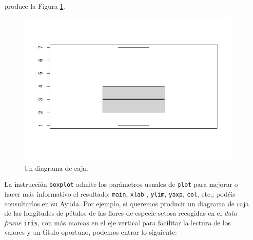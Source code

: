 \documentclass[
]{book}
\newenvironment{Shaded}{\begin{snugshade}}{\end{snugshade}}
\newcommand{\DataTypeTok}[1]{\textcolor[rgb]{0.13,0.29,0.53}{#1}}
\newcommand{\DecValTok}[1]{\textcolor[rgb]{0.00,0.00,0.81}{#1}}
\newcommand{\FloatTok}[1]{\textcolor[rgb]{0.00,0.00,0.81}{#1}}
\newcommand{\KeywordTok}[1]{\textcolor[rgb]{0.13,0.29,0.53}{\textbf{#1}}}
\newcommand{\NormalTok}[1]{#1}
\newcommand{\OperatorTok}[1]{\textcolor[rgb]{0.81,0.36,0.00}{\textbf{#1}}}
\newcommand{\StringTok}[1]{\textcolor[rgb]{0.31,0.60,0.02}{#1}}
\theoremstyle{definition}
\theoremstyle{definition}
\theoremstyle{definition}
\theoremstyle{remark}
\begin{document}
produce la Figura \ref{fig:182}.

\begin{figure}

{\centering \includegraphics[width=0.9\linewidth]{12chap12_Descripcion_cuantitativos_files/figure-latex/182-1} 

}

\caption{Un diagrama de caja.}\label{fig:182}
\end{figure}

La instrucción \texttt{boxplot} admite los parámetros usuales de \texttt{plot} para mejorar o hacer más informativo el resultado: \texttt{main}, \texttt{xlab} , \texttt{ylim}, \texttt{yaxp}, \texttt{col}, etc.; podéis consultarlos en su Ayuda. Por ejemplo, si queremos producir un diagrama de caja de las longitudes de pétalos de las flores de especie setosa recogidas en el \emph{data frame} \texttt{iris}, con más marcas en el eje vertical para facilitar la lectura de los valores y un título oportuno, podemos entrar lo siguiente:

\begin{Shaded}
\end{Shaded}
\end{document}
